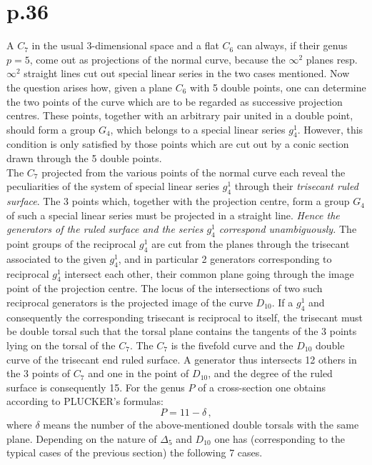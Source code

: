 \documentclass[leqno]{article}
\begin{document}
\section{p.36}
A $C_7$ in the usual 3-dimensional space and a flat $C_6$ can always, if their genus $p=5$, come out as projections of the normal curve, because the $\infty^2$ planes resp. $\infty^2$ straight lines cut out special linear series in the two cases mentioned. Now the question arises how, given a plane $C_6$ with 5 double points, one can determine the two points of the curve which are to be regarded as successive projection centres. These points, together with an arbitrary pair united in a double point, should form a group $G_4$, which belongs to a special linear series $g_4^1$. However, this condition is only satisfied by those points which are cut out by a conic section drawn through the 5 double points. \\
The $C_7$ projected from the various points of the normal curve each reveal the peculiarities of the system of special linear series $g_4^1$ through their \textit{trisecant ruled surface}. The 3 points which, together with the projection centre, form a group $G_4$ of such a special linear series must be projected in a straight line. \textit{Hence the generators of the ruled surface and the series $g_4^1$ correspond unambiguously.} The point groups of the reciprocal $g_4^1$ are cut from the planes through the trisecant associated to the given $g_4^1$, and in particular 2 generators corresponding to reciprocal $g_4^1$ intersect each other, their common plane going through the image point of the projection centre. The locus of the intersections of two such reciprocal generators is the projected image of the curve $D_{10}$. If a $g_4^1$ and consequently the corresponding trisecant is reciprocal to itself, the trisecant must be double torsal such that the torsal plane contains the tangents of the 3 points lying on the torsal of the $C_7$.
The $C_7$ is the fivefold curve and the $D_{10}$ double curve of the trisecant end ruled surface. A generator thus intersects 12 others in the 3 points of $C_7$ and one in the point of $D_{10}$, and the degree of the ruled surface is consequently 15. For the genus $P$ of a cross-section one obtains according to PLUCKER's formulas: 
\[
P=11-\delta \, , 
\]
where $\delta$ means the number of the above-mentioned double torsals with the same plane. Depending on the nature of $\Delta_5$ and $D_{10}$ one has (corresponding to the typical cases of the previous section) the following 7 cases.
\end{document}
